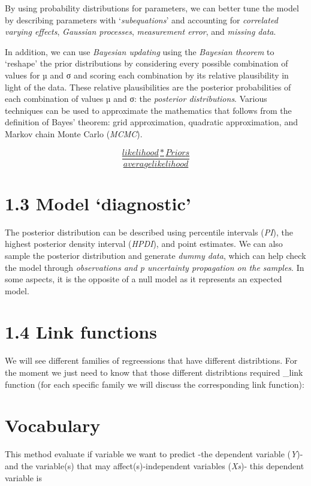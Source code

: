 \documentclass[
  letterpaper,
  DIV=11,
  numbers=noendperiod]{scrreprt}
\begin{document}
By using probability distributions for parameters, we can better tune
the model by describing parameters with `\emph{subequations}' and
accounting for \emph{correlated varying effects}, \emph{Gaussian
processes}, \emph{measurement error}, and \emph{missing data}.

In addition, we can use \emph{Bayesian updating} using the
\emph{Bayesian theorem} to `reshape' the prior distributions by
considering every possible combination of values for µ and σ and scoring
each combination by its relative plausibility in light of the data.
These relative plausibilities are the posterior probabilities of each
combination of values µ and σ: the \emph{posterior distributions}.
Various techniques can be used to approximate the mathematics that
follows from the definition of Bayes' theorem: grid approximation,
quadratic approximation, and Markov chain Monte Carlo (\emph{MCMC}).

\hyperref[]{\[\frac{likelihood*Priors}{average likelihood}\]}

\section{1.3 Model `diagnostic'}\label{model-diagnostic}

The posterior distribution can be described using percentile intervals
(\emph{PI}), the highest posterior density interval (\emph{HPDI}), and
point estimates. We can also sample the posterior distribution and
generate \emph{dummy data}, which can help check the model through
\emph{observations and p uncertainty propagation on the samples}. In
some aspects, it is the opposite of a null model as it represents an
expected model.

\section{1.4 Link functions}\label{link-functions}

We will see different families of regreessions that have different
distribtions. For the moment we just need to know that those different
distribtions required \_link function (for each specific family we will
discuss the corresponding link function):

\section{Vocabulary}\label{vocabulary}

This method evaluate if variable we want to predict -the dependent
variable (\emph{Y})- and the variable(s) that may affect(s)-independent
variables (\emph{Xs})- this dependent variable is
\end{document}

